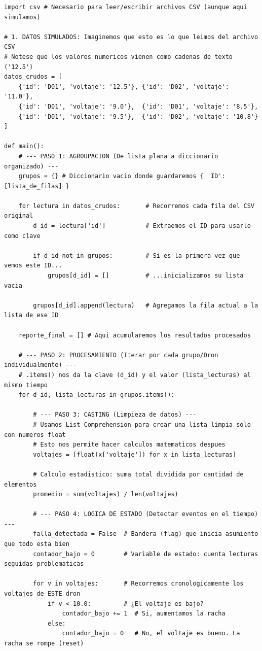 \documentclass[11pt, a4paper]{article}
\begin{document}
\begin{lstlisting}[caption={Integración de conceptos: Análisis de Baterías (Detallado)}, label={lst:baterias}]
import csv # Necesario para leer/escribir archivos CSV (aunque aqui simulamos)

# 1. DATOS SIMULADOS: Imaginemos que esto es lo que leimos del archivo CSV
# Notese que los valores numericos vienen como cadenas de texto ('12.5')
datos_crudos = [
    {'id': 'D01', 'voltaje': '12.5'}, {'id': 'D02', 'voltaje': '11.0'},
    {'id': 'D01', 'voltaje': '9.0'},  {'id': 'D01', 'voltaje': '8.5'},
    {'id': 'D01', 'voltaje': '9.5'},  {'id': 'D02', 'voltaje': '10.8'}
]

def main():
    # --- PASO 1: AGROUPACION (De lista plana a diccionario organizado) ---
    grupos = {} # Diccionario vacio donde guardaremos { 'ID': [lista_de_filas] }

    for lectura in datos_crudos:       # Recorremos cada fila del CSV original
        d_id = lectura['id']           # Extraemos el ID para usarlo como clave

        if d_id not in grupos:         # Si es la primera vez que vemos este ID...
            grupos[d_id] = []          # ...inicializamos su lista vacia

        grupos[d_id].append(lectura)   # Agregamos la fila actual a la lista de ese ID

    reporte_final = [] # Aqui acumularemos los resultados procesados

    # --- PASO 2: PROCESAMIENTO (Iterar por cada grupo/Dron individualmente) ---
    # .items() nos da la clave (d_id) y el valor (lista_lecturas) al mismo tiempo
    for d_id, lista_lecturas in grupos.items():

        # --- PASO 3: CASTING (Limpieza de datos) ---
        # Usamos List Comprehension para crear una lista limpia solo con numeros float
        # Esto nos permite hacer calculos matematicos despues
        voltajes = [float(x['voltaje']) for x in lista_lecturas]

        # Calculo estadistico: suma total dividida por cantidad de elementos
        promedio = sum(voltajes) / len(voltajes)

        # --- PASO 4: LOGICA DE ESTADO (Detectar eventos en el tiempo) ---
        falla_detectada = False  # Bandera (flag) que inicia asumiento que todo esta bien
        contador_bajo = 0        # Variable de estado: cuenta lecturas seguidas problematicas

        for v in voltajes:       # Recorremos cronologicamente los voltajes de ESTE dron
            if v < 10.0:         # ¿El voltaje es bajo?
                contador_bajo += 1  # Si, aumentamos la racha
            else:
                contador_bajo = 0   # No, el voltaje es bueno. La racha se rompe (reset)


\end{lstlisting}
\end{document}
